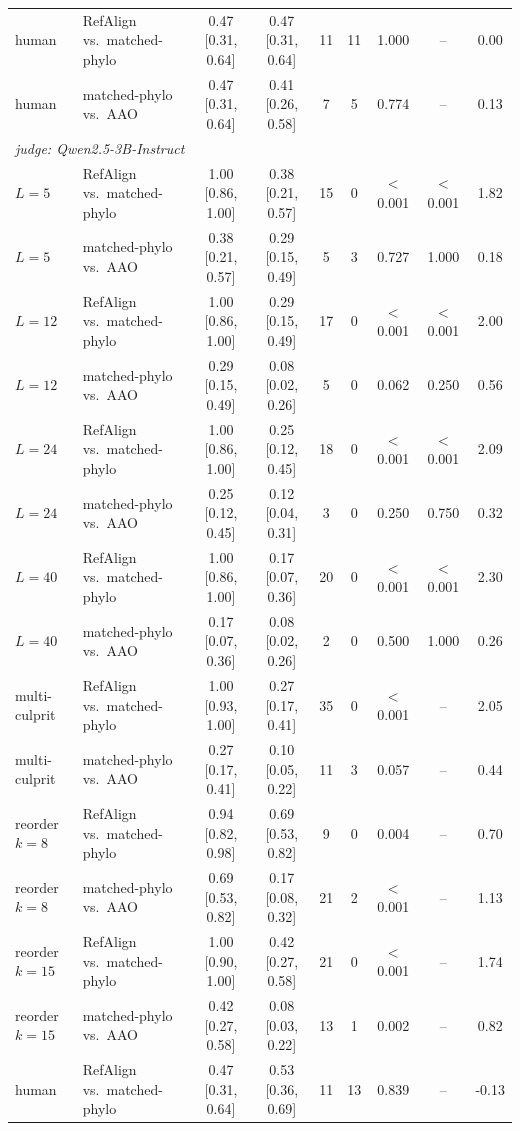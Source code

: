 \begin{table}[t]
\begin{tabular}{llccccccc}
human & RefAlign vs.\ matched-phylo & 0.47 [0.31, 0.64] & 0.47 [0.31, 0.64] & 11 & 11 & 1.000 & -- & 0.00 \\
human & matched-phylo vs.\ AAO & 0.47 [0.31, 0.64] & 0.41 [0.26, 0.58] & 7 & 5 & 0.774 & -- & 0.13 \\
\midrule
\multicolumn{9}{l}{\emph{judge: Qwen2.5-3B-Instruct}} \\
$L{=}5$ & RefAlign vs.\ matched-phylo & 1.00 [0.86, 1.00] & 0.38 [0.21, 0.57] & 15 & 0 & $<$0.001 & $<$0.001 & 1.82 \\
$L{=}5$ & matched-phylo vs.\ AAO & 0.38 [0.21, 0.57] & 0.29 [0.15, 0.49] & 5 & 3 & 0.727 & 1.000 & 0.18 \\
$L{=}12$ & RefAlign vs.\ matched-phylo & 1.00 [0.86, 1.00] & 0.29 [0.15, 0.49] & 17 & 0 & $<$0.001 & $<$0.001 & 2.00 \\
$L{=}12$ & matched-phylo vs.\ AAO & 0.29 [0.15, 0.49] & 0.08 [0.02, 0.26] & 5 & 0 & 0.062 & 0.250 & 0.56 \\
$L{=}24$ & RefAlign vs.\ matched-phylo & 1.00 [0.86, 1.00] & 0.25 [0.12, 0.45] & 18 & 0 & $<$0.001 & $<$0.001 & 2.09 \\
$L{=}24$ & matched-phylo vs.\ AAO & 0.25 [0.12, 0.45] & 0.12 [0.04, 0.31] & 3 & 0 & 0.250 & 0.750 & 0.32 \\
$L{=}40$ & RefAlign vs.\ matched-phylo & 1.00 [0.86, 1.00] & 0.17 [0.07, 0.36] & 20 & 0 & $<$0.001 & $<$0.001 & 2.30 \\
$L{=}40$ & matched-phylo vs.\ AAO & 0.17 [0.07, 0.36] & 0.08 [0.02, 0.26] & 2 & 0 & 0.500 & 1.000 & 0.26 \\
multi-culprit & RefAlign vs.\ matched-phylo & 1.00 [0.93, 1.00] & 0.27 [0.17, 0.41] & 35 & 0 & $<$0.001 & -- & 2.05 \\
multi-culprit & matched-phylo vs.\ AAO & 0.27 [0.17, 0.41] & 0.10 [0.05, 0.22] & 11 & 3 & 0.057 & -- & 0.44 \\
reorder $k{=}8$ & RefAlign vs.\ matched-phylo & 0.94 [0.82, 0.98] & 0.69 [0.53, 0.82] & 9 & 0 & 0.004 & -- & 0.70 \\
reorder $k{=}8$ & matched-phylo vs.\ AAO & 0.69 [0.53, 0.82] & 0.17 [0.08, 0.32] & 21 & 2 & $<$0.001 & -- & 1.13 \\
reorder $k{=}15$ & RefAlign vs.\ matched-phylo & 1.00 [0.90, 1.00] & 0.42 [0.27, 0.58] & 21 & 0 & $<$0.001 & -- & 1.74 \\
reorder $k{=}15$ & matched-phylo vs.\ AAO & 0.42 [0.27, 0.58] & 0.08 [0.03, 0.22] & 13 & 1 & 0.002 & -- & 0.82 \\
human & RefAlign vs.\ matched-phylo & 0.47 [0.31, 0.64] & 0.53 [0.36, 0.69] & 11 & 13 & 0.839 & -- & -0.13 \\

\end{tabular}
\end{table}
